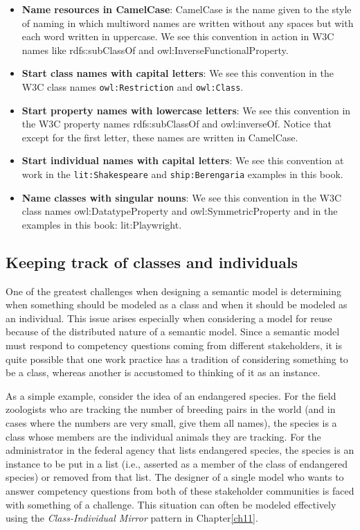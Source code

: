 \begin{itemize}
\item \textbf{Name resources in CamelCase}: CamelCase is the name given to the style of
naming in which multiword names are written without any spaces but with
each word written in uppercase. We see this convention in action in W3C
names like rdfs:subClassOf and owl:InverseFunctionalProperty.

\item \textbf{Start class names with capital letters}: We see this convention in the
W3C class names \texttt{owl:Restriction} and \texttt{owl:Class}.

\item \textbf{Start property names with lowercase letters}: We see this convention in
the W3C property names rdfs:subClassOf and owl:inverseOf. Notice that
except for the first letter, these names are written in CamelCase.

\item \textbf{Start individual names with capital letters}: We see this convention at
work in the
\texttt{lit:Shakespeare} and \texttt{ship:Berengaria} examples in this book.

\item \textbf{Name classes with singular nouns}: We see this convention in the W3C
class names owl:DatatypeProperty and owl:SymmetricProperty and in the
examples in this book: lit:Playwright.
\end{itemize}


\subsection{Keeping track of classes and individuals}

One of the greatest challenges when designing a semantic model is
determining when something should be modeled as a class and when it
should be modeled as an individual. This issue arises especially when
considering a model for reuse because of the distributed nature of a
semantic model. Since a semantic model must respond to competency
questions coming from different stakeholders, it is quite possible that
one work practice has a tradition of considering something to be a
class, whereas another is accustomed to thinking of it as an instance.

As a simple example, consider the idea of an endangered species. For the
field zoologists who are
tracking the number of breeding pairs in the world (and in cases where
the numbers are very small, give them all names), the species is a class
whose members are the individual animals they are tracking. For the
administrator in the federal agency that lists endangered species, the
species is an instance to be put in a list (i.e., asserted as a member
of the class of endangered species) or removed from that list. The
designer of a single model who wants to answer competency questions from
both of these stakeholder communities is faced with something of a
challenge. This situation can often be modeled effectively using the
\emph{Class-Individual Mirror} pattern in Chapter\ref{ch11}.


